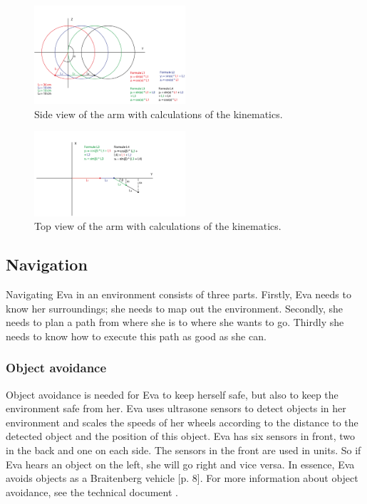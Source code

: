 \documentclass[project_eva.tex]{subfiles}
\begin{document}
\begin{figure}[h]
	\centering
	\mbox{\includegraphics[width=0.5\textwidth]{Images/2d_zijaanzicht.png}}
	\caption{Side view of the arm with calculations of the kinematics.}
	\label{fig:IK2}
\end{figure}

\begin{figure}[h!]
	\centering
	\mbox{\includegraphics[width=0.5\textwidth]{Images/2d_bovenaanzicht.png}}
	\caption{Top view of the arm with calculations of the kinematics.}
	\label{fig:IK1}
\end{figure}

\subsection*{Navigation}
Navigating Eva in an environment consists of three parts. Firstly, Eva needs to know her surroundings; she needs to map out the environment. Secondly, she needs to plan a path from where she is to where she wants to go. Thirdly she needs to know how to execute this path as good as she can.

\subsubsection*{Object avoidance}
Object avoidance is needed for Eva to keep herself safe, but also to keep the environment safe from her. Eva uses ultrasone 
sensors to detect objects in her environment and scales the speeds of her wheels according to the distance to the 
detected object and the position of this object. Eva has six sensors in front, two in the back and one on each side. The 
sensors in the front are used in units. So if Eva hears an object on the left, she will go right and vice 
versa. In essence, Eva avoids objects as a Braitenberg vehicle \cite{braitenberg} [p. 8]. For more information about object avoidance, see the technical document\cite{Tech} .
\end{document}
